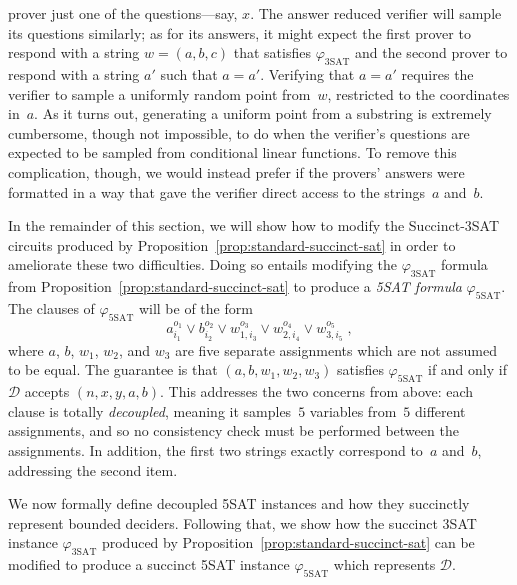 \documentclass[11pt]{article}
\theoremstyle{definition}
\newcommand{\decider}{\mathcal{D}}
\begin{document}
\begin{enumerate}
  prover just one of the questions---say, $x$.
	The answer reduced verifier will sample its questions similarly; as for its
  answers, it might expect the first prover to respond with a string $w = (a, b,
  c)$ that satisfies $\varphi_{\mathrm{3SAT}}$ and the second prover to respond
  with a string $a'$ such that $a = a'$.
	Verifying that $a = a'$ requires the verifier to sample a uniformly random
  point from~$w$, restricted to the coordinates in~$a$.
	As it turns out, generating a uniform point from a substring is extremely
  cumbersome, though not impossible, to do when the verifier's questions are
  expected to be sampled from conditional linear functions.
	To remove this complication, though, we would instead prefer if the provers'
  answers were formatted in a way that gave the verifier direct access to the
  strings~$a$ and~$b$.
\end{enumerate}
  
In the remainder of this section, we will show how to modify the Succinct-3SAT
circuits produced by Proposition~\ref{prop:standard-succinct-sat} in order to
ameliorate these two difficulties.
Doing so entails modifying the $\varphi_{\mathrm{3SAT}}$ formula from
Proposition~\ref{prop:standard-succinct-sat} to produce a \emph{5SAT formula}
$\varphi_{\mathrm{5SAT}}$.
The clauses of $\varphi_{\mathrm{5SAT}}$ will be of the form
\begin{equation*}
  a_{i_1}^{o_1} \lor b_{i_2}^{o_2} \lor w_{1, i_3}^{o_3}
  \lor w_{2, i_4}^{o_4} \lor w_{3, i_5}^{o_5}\;,
\end{equation*}
where $a$, $b$, $w_1$, $w_2$, and $w_3$ are five separate assignments which are
not assumed to be equal.
The guarantee is that $(a, b, w_1, w_2, w_3)$ satisfies
$\varphi_{\mathrm{5SAT}}$ if and only if $\decider$ accepts $(n, x, y, a, b)$.
This addresses the two concerns from above: each clause is totally
\emph{decoupled}, meaning it samples~$5$ variables from~$5$ different
assignments, and so no consistency check must be performed between the
assignments.
In addition, the first two strings exactly correspond to~$a$ and~$b$, addressing
the second item.

We now formally define decoupled 5SAT instances and how they succinctly
represent bounded deciders.
Following that, we show how the succinct 3SAT instance $\varphi_{\mathrm{3SAT}}$
produced by Proposition~\ref{prop:standard-succinct-sat} can be modified to
produce a succinct 5SAT instance $\varphi_{\mathrm{5SAT}}$ which represents
$\decider$.
\end{document}
